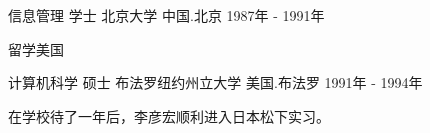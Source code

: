 

\begin{cventries}

  \cventry
    {信息管理 学士} %
    {北京大学} %
    {中国.北京} %
    {1987年 - 1991年} %
    {
      \begin{cvitems} %
        \item {留学美国}
      \end{cvitems}
    }


  \cventry
    {计算机科学 硕士} %
    {布法罗纽约州立大学} %
    {美国.布法罗} %
    {1991年 - 1994年} %
    {
      \begin{cvitems} %
        \item {在学校待了一年后，李彦宏顺利进入日本松下实习。}
      \end{cvitems}
    }


\end{cventries}
